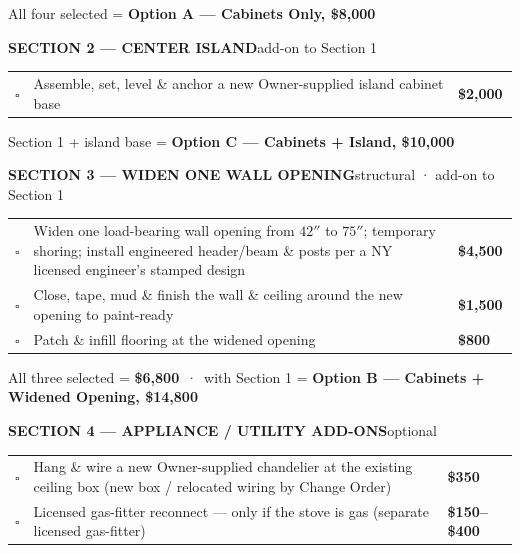 \documentclass[11pt]{article}
\newcommand{\cb}{\textcolor{accent}{\large$\square$}}
\newcommand{\band}[2]{%
  \vspace{9pt}%
  \noindent\colorbox{ink}{\parbox{\dimexpr\textwidth-2\fboxsep\relax}{%
    \vspace{2.5pt}\color{white}\textbf{\small #1}\hfill{\footnotesize\color{accent}#2}\vspace{2.5pt}}}%
  \vspace{5pt}\par}
\newcommand{\hitem}[3]{\cb & \raggedright #1 & \textbf{#2}\,#3 \\[2pt]}
\begin{document}
\vspace{3pt}
\hfill{\footnotesize\color{slate}All four selected = \textbf{\color{ink}Option A — Cabinets Only, \$8{,}000}}

\band{SECTION 2 — CENTER ISLAND}{add-on to Section 1}

\noindent\begin{tabularx}{\textwidth}{@{}C >{\raggedright\arraybackslash}X P@{}}
\hitem{Assemble, set, level \& anchor a new Owner-supplied island cabinet base}{\$2{,}000}{}
\end{tabularx}

\vspace{3pt}
\hfill{\footnotesize\color{slate}Section 1 + island base = \textbf{\color{ink}Option C — Cabinets + Island, \$10{,}000}}

\band{SECTION 3 — WIDEN ONE WALL OPENING}{structural · add-on to Section 1}

\noindent\begin{tabularx}{\textwidth}{@{}C >{\raggedright\arraybackslash}X P@{}}
\hitem{Widen one load-bearing wall opening from $42''$ to $75''$; temporary shoring; install engineered header/beam \& posts per a NY licensed engineer's stamped design}{\$4{,}500}{}
\midrule
\hitem{Close, tape, mud \& finish the wall \& ceiling around the new opening to paint-ready}{\$1{,}500}{}
\midrule
\hitem{Patch \& infill flooring at the widened opening}{\$800}{}
\end{tabularx}

\vspace{3pt}
\hfill{\footnotesize\color{slate}All three selected = \textbf{\color{ink}\$6{,}800}\ ·\ with Section 1 = \textbf{\color{ink}Option B — Cabinets + Widened Opening, \$14{,}800}}

\vspace{9pt}
\noindent\begin{minipage}{\textwidth}
\band{SECTION 4 — APPLIANCE / UTILITY ADD-ONS}{optional}

\noindent\begin{tabularx}{\textwidth}{@{}C >{\raggedright\arraybackslash}X P@{}}
\hitem{Hang \& wire a new Owner-supplied chandelier at the existing ceiling box \textnormal{\scriptsize(new box / relocated wiring by Change Order)}}{\$350}{}
\midrule
\hitem{Licensed gas-fitter reconnect — only if the stove is gas \textnormal{\scriptsize(separate licensed gas-fitter)}}{\$150–\$400}{}
\end{tabularx}
\end{minipage}
\end{document}
